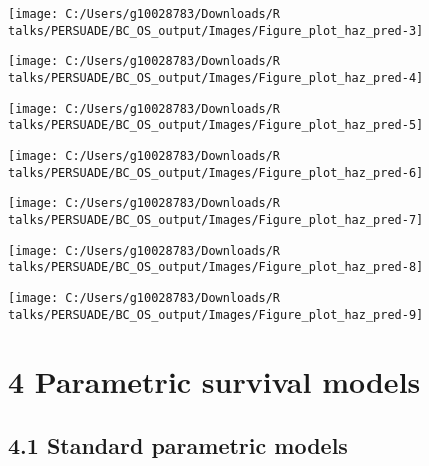 \documentclass[
]{article}
\begin{document}
\begin{flushleft}\texttt{[image: C:/Users/g10028783/Downloads/R talks/PERSUADE/BC\_OS\_output/Images/Figure\_plot\_haz\_pred-3]} \end{flushleft}

\begin{flushleft}\texttt{[image: C:/Users/g10028783/Downloads/R talks/PERSUADE/BC\_OS\_output/Images/Figure\_plot\_haz\_pred-4]} \end{flushleft}

\begin{flushleft}\texttt{[image: C:/Users/g10028783/Downloads/R talks/PERSUADE/BC\_OS\_output/Images/Figure\_plot\_haz\_pred-5]} \end{flushleft}

\begin{flushleft}\texttt{[image: C:/Users/g10028783/Downloads/R talks/PERSUADE/BC\_OS\_output/Images/Figure\_plot\_haz\_pred-6]} \end{flushleft}

\begin{flushleft}\texttt{[image: C:/Users/g10028783/Downloads/R talks/PERSUADE/BC\_OS\_output/Images/Figure\_plot\_haz\_pred-7]} \end{flushleft}

\begin{flushleft}\texttt{[image: C:/Users/g10028783/Downloads/R talks/PERSUADE/BC\_OS\_output/Images/Figure\_plot\_haz\_pred-8]} \end{flushleft}

\begin{flushleft}\texttt{[image: C:/Users/g10028783/Downloads/R talks/PERSUADE/BC\_OS\_output/Images/Figure\_plot\_haz\_pred-9]} \end{flushleft}

\clearpage

\section{4 Parametric survival models}\label{parametric-survival-models}

\subsection{4.1 Standard parametric
models}\label{standard-parametric-models}
\end{document}
